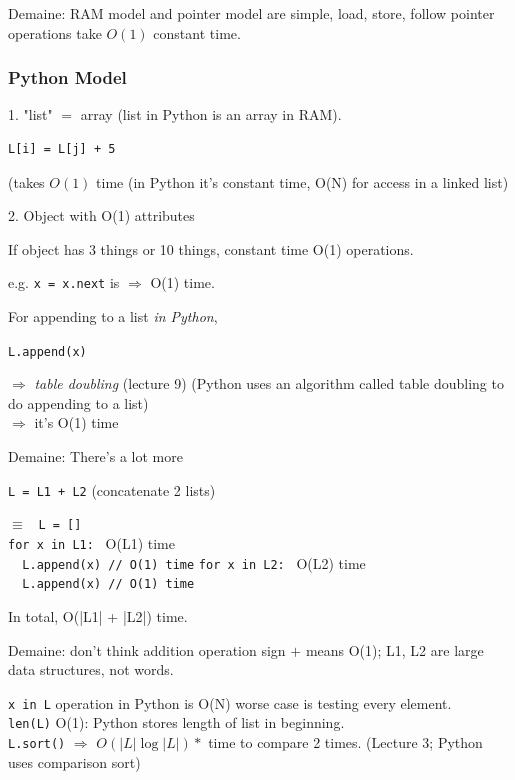 \documentclass[10pt]{amsart}
\begin{document}
\begin{multicols*}{2}
Demaine: RAM model and pointer model are simple, load, store, follow pointer operations take $O(1)$ constant time.

\subsubsection{Python Model}

1. "list" $=$ array (list in Python is an array in RAM).

\begin{verbatim}
L[i] = L[j] + 5	
\end{verbatim}
(takes $O(1)$ time (in Python it's constant time, O(N) for access in a linked list)

2. Object with O(1) attributes

If object has 3 things or 10 things, constant time O(1) operations.

e.g. \verb|x = x.next| is $\Longrightarrow$ O(1) time.

For appending to a list \emph{in Python},

\verb|L.append(x)|

$\Longrightarrow$ \emph{table doubling} (lecture 9) (Python uses an algorithm called table doubling to do appending to a list) \\
$\Longrightarrow$ it's O(1) time 

Demaine: There's a lot more 

\verb|L = L1 + L2| (concatenate 2 lists)

$\equiv $ \verb| L = [] | \\

\verb|for x in L1:| \quad \quad \, O(L1) time \\
\verb|  L.append(x) // O(1) time|
\verb|for x in L2:| \quad \quad \, O(L2) time \\
\verb|  L.append(x) // O(1) time|

In total, O(|L1| + |L2|) time.

Demaine: don't think addition operation sign $+$ means O(1); L1, L2 are large data structures, not words.

\verb|x in L| operation in Python is O(N) worse case is testing every element. \\

\verb|len(L)| O(1): Python stores length of list in beginning. \\

\verb|L.sort()| $\Longrightarrow$ $O(|L| \log{ |L|}) * $ time to compare 2 times.  (Lecture 3; Python uses comparison sort) \\


\end{multicols*}
\end{document}
